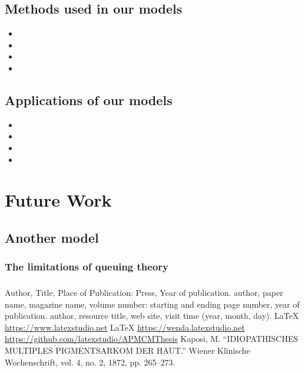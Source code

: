 \documentclass{apmcmthesis}
\begin{document}
\subsection{Methods used in our models}
\begin{itemize}
  \item
  \item
  \item
  \item
\end{itemize}
\subsection{Applications of our models}
\begin{itemize}
  \item
  \item
  \item
  \item
\end{itemize}
\section{Future Work}
\subsection{Another model}
\subsubsection{The limitations of queuing theory}




\subsubsection{}


\subsubsection{}



\subsubsection{}





\begin{thebibliography}{9}%
   Author, Title, Place of Publication: Press, Year of publication.
   author, paper name, magazine name, volume number: starting and ending
  page number, year of publication.
   author, resource title, web site, visit time (year, month, day).
   \LaTeX{} \url{https://www.latexstudio.net}
   \LaTeX{} \url{https://wenda.latexstudio.net}
    \url{https://github.com/latexstudio/APMCMThesis}
   Kaposi, M. “IDIOPATHISCHES MULTIPLES PIGMENTSARKOM DER HAUT.” Wiener Klinische Wochenschrift, vol. 4, no. 2, 1872, pp. 265–273.
\end{thebibliography}
\end{document}
